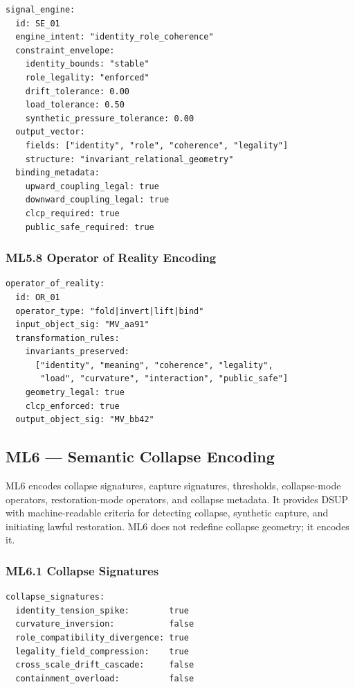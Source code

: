 \begin{verbatim}
signal_engine:
  id: SE_01
  engine_intent: "identity_role_coherence"
  constraint_envelope:
    identity_bounds: "stable"
    role_legality: "enforced"
    drift_tolerance: 0.00
    load_tolerance: 0.50
    synthetic_pressure_tolerance: 0.00
  output_vector:
    fields: ["identity", "role", "coherence", "legality"]
    structure: "invariant_relational_geometry"
  binding_metadata:
    upward_coupling_legal: true
    downward_coupling_legal: true
    clcp_required: true
    public_safe_required: true
\end{verbatim}
\subsubsection*{ML5.8 Operator of Reality Encoding}

\begin{verbatim}
operator_of_reality:
  id: OR_01
  operator_type: "fold|invert|lift|bind"
  input_object_sig: "MV_aa91"
  transformation_rules:
    invariants_preserved:
      ["identity", "meaning", "coherence", "legality",
       "load", "curvature", "interaction", "public_safe"]
    geometry_legal: true
    clcp_enforced: true
  output_object_sig: "MV_bb42"
\end{verbatim}


\subsection*{ML6 — Semantic Collapse Encoding}

ML6 encodes collapse signatures, capture signatures, thresholds, collapse-mode
operators, restoration-mode operators, and collapse metadata. It provides DSUP
with machine-readable criteria for detecting collapse, synthetic capture, and
initiating lawful restoration. ML6 does not redefine collapse geometry; it
encodes it.

\subsubsection*{ML6.1 Collapse Signatures}

\begin{verbatim}
collapse_signatures:
  identity_tension_spike:        true
  curvature_inversion:           false
  role_compatibility_divergence: true
  legality_field_compression:    true
  cross_scale_drift_cascade:     false
  containment_overload:          false
\end{verbatim}



